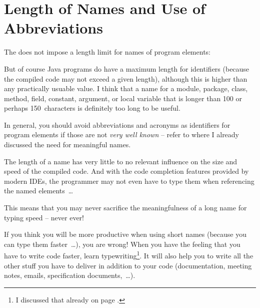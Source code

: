 \section{Length of Names and Use of Abbreviations}\label{sec:LengthOfNamesAndUseOfAbbreviations}
The \jlsref does not impose a length limit for names of program elements:  \autocite{ORACLE_DOC_LANGUAGE_SPECIFICATION:Identifiers}

But of course Java programs do have a maximum length for identifiers (because the compiled code may not exceed a given length), although this is higher than any practically usuable value. I think that a name for a module, package, class, method, field, constant, argument, or local variable that is longer than 100 or perhaps 150~characters is definitely too long to be useful.

In general, you should avoid abbreviations and acronyms as identifiers for program elements if those are not \textit{very well known} – refer to  where I already discussed the need for meaningful names.

The length of a name has very little to no relevant influence on the size and speed of the compiled code. And with the code completion features provided by modern IDEs, the programmer may not even have to type them when referencing the named elements~…

This means that you may never sacrifice the meaningfulness of a long name for typing speed – never ever!

If you think you will be more productive when using short names (because you can type them faster~…), you are wrong! When you have the feeling that you have to write code faster, learn typewriting\footnote{I discussed that already on page \pageref{ref:Typewriting}.}. It will also help you to write all the other stuff you have to deliver in addition to your code (documentation, meeting notes, emails, specification documents,~…).


